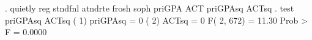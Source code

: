 . quietly reg stndfnl atndrte frosh soph priGPA ACT priGPAsq ACTsq
{\smallskip}
. test priGPAsq ACTsq
{\smallskip}
 ( 1)  priGPAsq = 0
 ( 2)  ACTsq = 0
{\smallskip}
       F(  2,   672) =   11.30
            Prob > F =    0.0000
{\smallskip}
